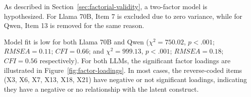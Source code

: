 \documentclass{DESSThesis}
\begin{document}
As described in Section~\ref{sec:factorial-validity}, a two-factor model is hypothesized. For Llama 70B, Item 7 is excluded due to zero variance, while for Qwen, Item 13 is removed for the same reason. 

Model fit is low for both Llama 70B and Qwen ($\chi^2 = 750.02$, $p < .001$; $RMSEA = 0.11$; $CFI = 0.66$; and $\chi^2 = 999.13$, $p < .001$; $RMSEA = 0.18$; $CFI = 0.56$ respectively). For both LLMs, the significant factor loadings are illustrated in Figure~\ref{fig:factor-loadings}. In most cases, the reverse-coded items (X3, X6, X7, X13, X18, X21) have negative or not significant loadings, indicating they have a negative or no relationship with the latent construct.

\begin{figure}[hbt!]
	\centering
	\hspace{2cm}

\end{figure}
\end{document}
